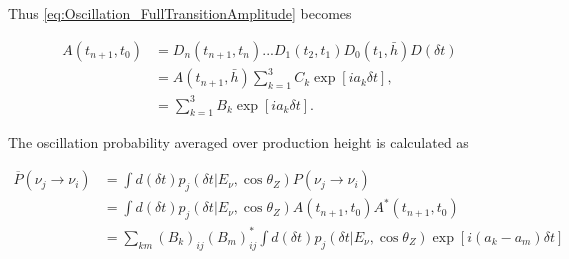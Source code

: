 Thus \autoref{eq:Oscillation_FullTransitionAmplitude} becomes

\begin{equation}
  \begin{split}
    A(t_{n+1},t_{0}) &= D_{n}(t_{n+1},t_{n})...D_{1}(t_{2},t_{1})D_{0}(t_{1},\bar{h})D(\delta t) \\
    &= A(t_{n+1},\bar{h}) \sum_{k=1}^{3} C_{k} \exp[ia_{k} \delta t], \\
    &= \sum_{k=1}^{3} B_{k} \exp[ia_{k} \delta t].
  \end{split}
\end{equation}

The oscillation probability averaged over production height is calculated as

\begin{equation}
  \begin{split}
    \overline P(\nu_{j} \rightarrow \nu_{i}) &= \int d(\delta t) p_{j}(\delta t|E_{\nu}, \cos\theta_{Z}) P(\nu_{j} \rightarrow \nu_{i}) \\
    &= \int d(\delta t) p_{j}(\delta t|E_{\nu}, \cos\theta_{Z})	A(t_{n+1},t_{0}) A^{*}(t_{n+1},t_{0}) \\
    &= \sum_{km} (B_{k})_{ij} (B_{m})^{*}_{ij} \int d(\delta t) p_{j}(\delta t|E_{\nu}, \cos\theta_{Z}) \exp[i(a_{k}-a_{m})\delta t]
  \end{split}
\end{equation}

